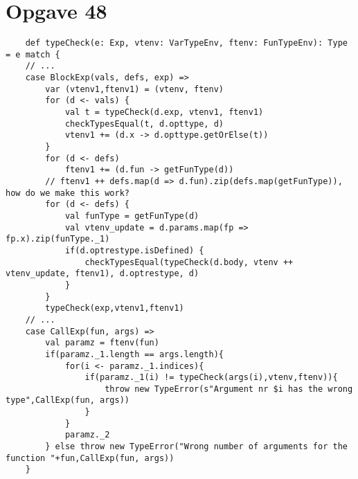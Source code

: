 \documentclass[a4paper, 10pt]{article}
\theoremstyle{remark}
\begin{document}
	\section*{Opgave 48}
	\begin{lstlisting}
	def typeCheck(e: Exp, vtenv: VarTypeEnv, ftenv: FunTypeEnv): Type = e match {
	// ...
	case BlockExp(vals, defs, exp) =>
		var (vtenv1,ftenv1) = (vtenv, ftenv)
		for (d <- vals) {
			val t = typeCheck(d.exp, vtenv1, ftenv1)
			checkTypesEqual(t, d.opttype, d)
			vtenv1 += (d.x -> d.opttype.getOrElse(t))
		}
		for (d <- defs)
			ftenv1 += (d.fun -> getFunType(d))
		// ftenv1 ++ defs.map(d => d.fun).zip(defs.map(getFunType)), how do we make this work?
		for (d <- defs) {
			val funType = getFunType(d)
			val vtenv_update = d.params.map(fp => fp.x).zip(funType._1)
			if(d.optrestype.isDefined) {
				checkTypesEqual(typeCheck(d.body, vtenv ++ vtenv_update, ftenv1), d.optrestype, d)
			}
		}
		typeCheck(exp,vtenv1,ftenv1)
	// ...
	case CallExp(fun, args) =>
		val paramz = ftenv(fun)
		if(paramz._1.length == args.length){
			for(i <- paramz._1.indices){
				if(paramz._1(i) != typeCheck(args(i),vtenv,ftenv)){
					throw new TypeError(s"Argument nr $i has the wrong type",CallExp(fun, args))
				}
			}
			paramz._2
		} else throw new TypeError("Wrong number of arguments for the function "+fun,CallExp(fun, args))
	}
	\end{lstlisting}
\end{document}
